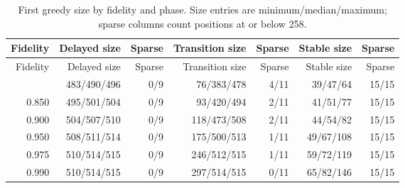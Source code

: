 \begingroup\small\setlength{\tabcolsep}{4pt}
\begin{longtable}{r rr rr rr}
\caption{First greedy size by fidelity and phase. Size entries are minimum/median/maximum; sparse columns count positions at or below 258.}\label{tab:e3grid}\\
\toprule
Fidelity & Delayed size & Sparse & Transition size & Sparse & Stable size & Sparse \\

\midrule\endfirsthead
\toprule
Fidelity & Delayed size & Sparse & Transition size & Sparse & Stable size & Sparse \\

\midrule\endhead
\bottomrule\endfoot
0.800 & 483/490/496 & 0/9 & 76/383/478 & 4/11 & 39/47/64 & 15/15 \\
0.850 & 495/501/504 & 0/9 & 93/420/494 & 2/11 & 41/51/77 & 15/15 \\
0.900 & 504/507/510 & 0/9 & 118/473/508 & 2/11 & 44/54/82 & 15/15 \\
0.950 & 508/511/514 & 0/9 & 175/500/513 & 1/11 & 49/67/108 & 15/15 \\
0.975 & 510/514/515 & 0/9 & 246/512/515 & 1/11 & 59/72/119 & 15/15 \\
0.990 & 510/514/515 & 0/9 & 297/514/515 & 0/11 & 65/82/146 & 15/15 \\
\end{longtable}
\endgroup
